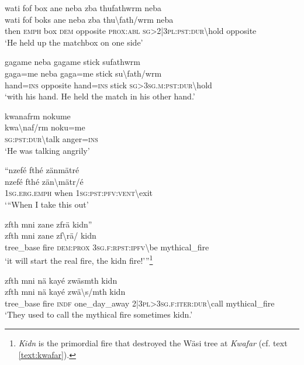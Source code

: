 \ea\label{ex:11:a2524}
wati fof box ane neba zba thufathwrm neba\\
\gll wati	fof	boks	ane	neba	zba	thu{\textbackslash}fath/wrm	neba\\
     then	\textsc{emph}	box	\textsc{dem}	opposite	\textsc{prox}:\textsc{abl}	\textsc{sg}>2|3\textsc{pl}:\textsc{pst}:\textsc{dur}{\textbackslash}hold	opposite\\
\glt `He held up the matchbox on one side'
\z

\ea\label{ex:11:a2525}
gagame neba gagame stick sufathwrm\\
\gll gaga=me	neba	gaga=me	stick	su{\textbackslash}fath/wrm\\
     hand=\textsc{ins}	opposite	hand=\textsc{ins}	stick	\textsc{sg}>3\textsc{sg}.\textsc{m}:\textsc{pst}:\textsc{dur}{\textbackslash}hold\\
\glt `with his hand. He held the match in his other hand.'
\z

\ea\label{ex:11:a2526}
kwanafrm nokume\\
\gll kwa{\textbackslash}naf/rm	noku=me\\
     \textsc{sg}:\textsc{pst}:\textsc{dur}{\textbackslash}talk	anger=\textsc{ins}\\
\glt `He was talking angrily'
\z

\ea\label{ex:11:a2527}
``nzefé fthé zänmätré\\
\gll nzefé	fthé	zän{\textbackslash}mätr/é\\
     1\textsc{sg}.\textsc{erg}.\textsc{emph}	when	1\textsc{sg}:\textsc{pst}:\textsc{pfv}:\textsc{vent}{\textbackslash}exit\\
\glt `{``}When I take this out'
\z

\ea\label{ex:11:a2528}
zfth mni zane zfrä kidn''\\
\gll zfth	mni	zane	zf{\textbackslash}rä/	kidn\\
     tree\_base	fire	\textsc{dem}:\textsc{prox}	3\textsc{sg}.\textsc{f}:\textsc{rpst}:\textsc{ipfv}{\textbackslash}be	mythical\_fire\\
\glt `it will start the real fire, the kidn fire!'''\footnote{\textit{Kidn} is the primordial fire that destroyed the Wäsi tree at \textit{Kwafar} (cf. text \ref{text:kwafar}).}
\z

\ea\label{ex:11:a2529}
zfth mni nä kayé zwäsmth kidn\\
\gll zfth	mni	nä	kayé	zwä{\textbackslash}s/mth	kidn\\
     tree\_base	fire	\textsc{indf}	one\_day\_away	2|3\textsc{pl}>3\textsc{sg}.\textsc{f}:\textsc{iter}:\textsc{dur}{\textbackslash}call	mythical\_fire\\
\glt `They used to call the mythical fire sometimes kidn.'
\z

